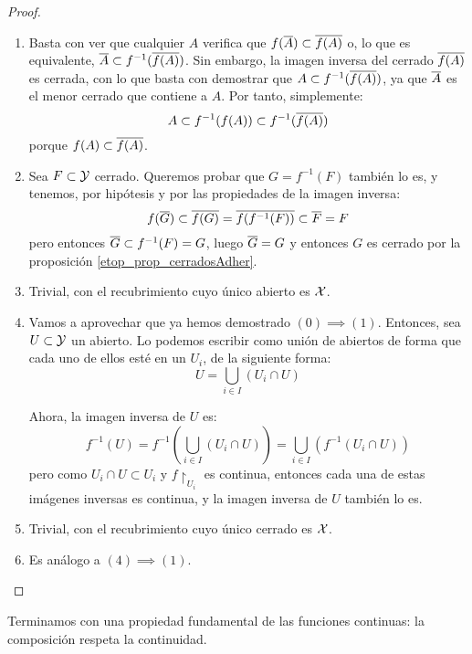 \begin{prop}
\begin{proof}
\begin{enumerate}[align=left, leftmargin=*]
			\item[\fbox{$(2)\implies (3)$}] Basta con ver que cualquier $A$ verifica que $f(\overline{A})\subset \overline{f(A)}$ o, lo que es equivalente, $\overline{A}\subset f^{-1}(\overline{f(A)})$. Sin embargo, la imagen inversa del cerrado $\overline{f(A)}$ es cerrada, con lo que basta con demostrar que $A\subset f^{-1}(\overline{f(A)})$, ya que $\overline{A}$ es el menor cerrado que contiene a $A$. Por tanto, simplemente:
			\[A\subset f^{-1}(f(A))\subset f^{-1}(\overline{f(A)})\]
			porque $f(A)\subset\overline{f(A)}$.
			
			\item[\fbox{$(3)\implies (2)$}] Sea $F\subset\mathcal{Y}$ cerrado. Queremos probar que $G=f^{-1}(F)$ también lo es, y tenemos, por hipótesis y por las propiedades de la imagen inversa:
			\[f(\overline{G})\subset\overline{f(G)}=\overline{f(f^{-1}(F))}\subset\overline{F}=F\]
			pero entonces $\overline{G}\subset f^{-1}(F)=G$, luego $\overline{G}=G$ y entonces $G$ es cerrado por la proposición \ref{etop_prop_cerradosAdher}.
						
			\item[\fbox{$(0)\implies (4)$}] Trivial, con el recubrimiento cuyo único abierto es $\mathcal{X}$.
			
			\item[\fbox{$(4)\implies (1)$}] Vamos a aprovechar que ya hemos demostrado $(0)\implies (1)$. Entonces, sea $U\subset\mathcal{Y}$ un abierto. Lo podemos escribir como unión de abiertos de forma que cada uno de ellos esté en un $U_i$, de la siguiente forma:
			\[U=\bigcup\limits_{i\in I} (U_i\cap U)\]
			
			Ahora, la imagen inversa de $U$ es:
			\[f^{-1}(U)=f^{-1}\left(\bigcup\limits_{i\in I} (U_i\cap U)\right)=\bigcup\limits_{i\in I} (f^{-1}(U_i\cap U))\]
			pero como $U_i\cap U\subset U_i$ y $f\restriction_{U_i}$ es continua, entonces cada una de estas imágenes inversas es continua, y la imagen inversa de $U$ también lo es.
			
			\item[\fbox{$(0)\implies (5)$}] Trivial, con el recubrimiento cuyo único cerrado es $\mathcal{X}$.
			
			\item[\fbox{$(5)\implies (2)$}] Es análogo a $(4)\implies (1)$. \qedhere
		\end{enumerate}
	\end{proof}
\end{prop}

Terminamos con una propiedad fundamental de las funciones continuas: la composición respeta la continuidad.

